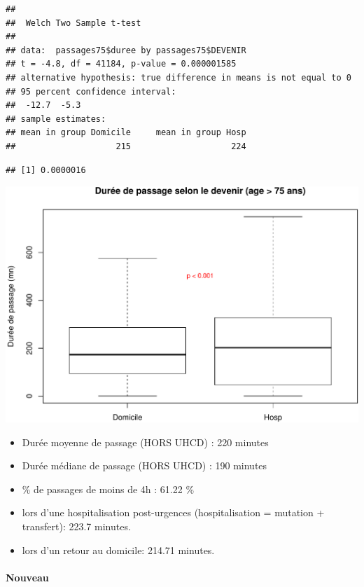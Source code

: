 \documentclass[]{article}
\begin{document}
\begin{verbatim}
## 
##  Welch Two Sample t-test
## 
## data:  passages75$duree by passages75$DEVENIR
## t = -4.8, df = 41184, p-value = 0.000001585
## alternative hypothesis: true difference in means is not equal to 0
## 95 percent confidence interval:
##  -12.7  -5.3
## sample estimates:
## mean in group Domicile     mean in group Hosp 
##                    215                    224
\end{verbatim}

\begin{verbatim}
## [1] 0.0000016
\end{verbatim}

\includegraphics{rapport2014_V4_files/figure-latex/duree_passage_75-1.pdf}

\begin{itemize}
\itemsep1pt\parskip0pt
\item
  Durée moyenne de passage (HORS UHCD) : 220 minutes
\item
  Durée médiane de passage (HORS UHCD) : 190 minutes
\item
  \% de passages de moins de 4h : 61.22 \%
\item
  lors d'une hospitalisation post-urgences (hospitalisation = mutation +
  transfert): 223.7 minutes.
\item
  lors d'un retour au domicile: 214.71 minutes.
\end{itemize}

\paragraph{Nouveau}\label{nouveau}
\end{document}
